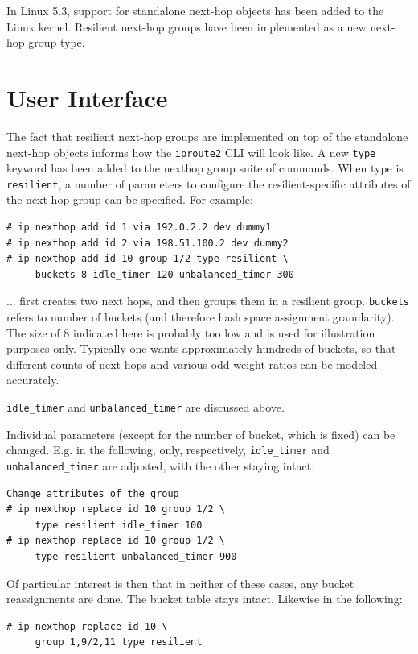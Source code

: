 \documentclass[letterpaper]{article}
\begin{document}
In Linux 5.3, support for standalone next-hop objects has been added to the
Linux kernel. Resilient next-hop groups have been implemented as a new
next-hop group type.

\section{User Interface}

The fact that resilient next-hop groups are implemented on top of the
standalone next-hop objects informs how the \texttt{iproute2} CLI will look
like. A new \texttt{type} keyword has been added to the nexthop group suite
of commands. When type is \texttt{resilient}, a number of parameters to
configure the resilient-specific attributes of the next-hop group can be
specified. For example:

\begin{verbatim}
# ip nexthop add id 1 via 192.0.2.2 dev dummy1
# ip nexthop add id 2 via 198.51.100.2 dev dummy2
# ip nexthop add id 10 group 1/2 type resilient \
     buckets 8 idle_timer 120 unbalanced_timer 300
\end{verbatim}

... first creates two next hops, and then groups them in a resilient group.
\texttt{buckets} refers to number of buckets (and therefore hash space
assignment granularity). The size of 8 indicated here is probably too low
and is used for illustration purposes only. Typically one wants
approximately hundreds of buckets, so that different counts of next hops
and various odd weight ratios can be modeled accurately.

\texttt{idle\_timer} and \texttt{unbalanced\_timer} are discussed above.

Individual parameters (except for the number of bucket, which is fixed) can
be changed. E.g. in the following, only, respectively, \texttt{idle\_timer}
and \texttt{unbalanced\_timer} are adjusted, with the other staying intact:

\begin{verbatim}
Change attributes of the group
# ip nexthop replace id 10 group 1/2 \
     type resilient idle_timer 100
# ip nexthop replace id 10 group 1/2 \
     type resilient unbalanced_timer 900
\end{verbatim}

Of particular interest is then that in neither of these cases, any bucket
reassignments are done. The bucket table stays intact. Likewise in the
following:

\begin{verbatim}
# ip nexthop replace id 10 \
     group 1,9/2,11 type resilient
\end{verbatim}
\end{document}
